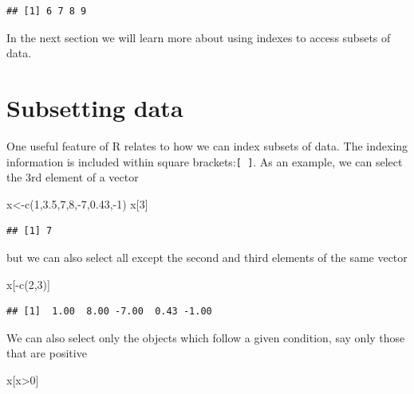 \documentclass[
]{article}
\newenvironment{Shaded}{\begin{snugshade}}{\end{snugshade}}
\newcommand{\DecValTok}[1]{\textcolor[rgb]{0.00,0.00,0.81}{#1}}
\newcommand{\FloatTok}[1]{\textcolor[rgb]{0.00,0.00,0.81}{#1}}
\newcommand{\FunctionTok}[1]{\textcolor[rgb]{0.00,0.00,0.00}{#1}}
\newcommand{\NormalTok}[1]{#1}
\newcommand{\OtherTok}[1]{\textcolor[rgb]{0.56,0.35,0.01}{#1}}
\newcommand{\SpecialCharTok}[1]{\textcolor[rgb]{0.00,0.00,0.00}{#1}}
\begin{document}
\begin{verbatim}
## [1] 6 7 8 9
\end{verbatim}

In the next section we will learn more about using indexes to access
subsets of data.

\hypertarget{subsetting-data}{%
\section{Subsetting data}\label{subsetting-data}}

One useful feature of R relates to how we can index subsets of data. The
indexing information is included within square
brackets:\texttt{{[}\ {]}}. As an example, we can select the 3rd element
of a vector

\begin{Shaded}
\begin{Highlighting}[]
\NormalTok{x}\OtherTok{\textless{}{-}}\FunctionTok{c}\NormalTok{(}\DecValTok{1}\NormalTok{,}\FloatTok{3.5}\NormalTok{,}\DecValTok{7}\NormalTok{,}\DecValTok{8}\NormalTok{,}\SpecialCharTok{{-}}\DecValTok{7}\NormalTok{,}\FloatTok{0.43}\NormalTok{,}\SpecialCharTok{{-}}\DecValTok{1}\NormalTok{)}
\NormalTok{x[}\DecValTok{3}\NormalTok{]}
\end{Highlighting}
\end{Shaded}

\begin{verbatim}
## [1] 7
\end{verbatim}

but we can also select all except the second and third elements of the
same vector

\begin{Shaded}
\begin{Highlighting}[]
\NormalTok{x[}\SpecialCharTok{{-}}\FunctionTok{c}\NormalTok{(}\DecValTok{2}\NormalTok{,}\DecValTok{3}\NormalTok{)]}
\end{Highlighting}
\end{Shaded}

\begin{verbatim}
## [1]  1.00  8.00 -7.00  0.43 -1.00
\end{verbatim}

We can also select only the objects which follow a given condition, say
only those that are positive

\begin{Shaded}
\begin{Highlighting}[]
\NormalTok{x[x}\SpecialCharTok{\textgreater{}}\DecValTok{0}\NormalTok{]}
\end{Highlighting}
\end{Shaded}
\end{document}
